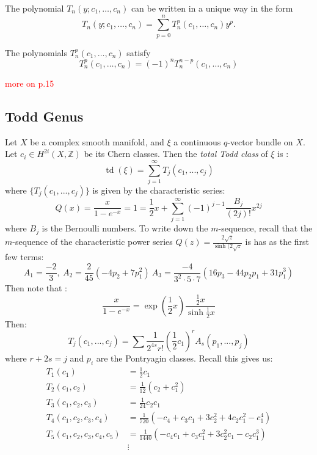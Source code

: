 \documentclass{book}
\newcommand{\Z}{{\mathbb{Z}}}
\newcommand{\td}{{\operatorname{td}}}
\begin{document}
The polynomial $T_n(y;c_1,\ldots,c_n)$ can be written in a unique way in the form
\[
    T_n(y;c_1,\ldots,c_n) = \sum_{p=0}^n T_n^p(c_1,\ldots,c_n)y^p.
\]

The polynomials $T_n^p(c_1,\ldots,c_n)$ satisfy
\[
    T_n^p(c_1,\ldots,c_n) = (-1)^n T_n^{n-p}(c_1,\ldots,c_n)
\]

\textcolor{red}{more on p.15}

\subsection{Todd Genus}\label{sec:toddGenus}

Let $X$ be a complex smooth manifold, and $\xi$ a continuous $q$-vector bundle on $X$. Let $c_i \in H^{2i}(X, \Z)$
be its Chern classes. Then the \emph{total Todd class} of $\xi$ is :
\[
  \td(\xi) = \sum_{j=1}^\infty T_j(c_1, ..., c_j)
\]
where $\{T_j(c_1, ..., c_j)\}$ is given by the characteristic series:
\[
  Q(x) = \frac{x}{1-e^{-x}} = 1 = \frac{1}{2}x + \sum_{j=1}^\infty (-1)^{j-1} \frac{B_j}{(2j)!}x^{2j}
\]
where $B_j$ is the Bernoulli numbers. To write down the $m$-sequence, recall that the $m$-sequence of the
characteristic power series $Q(z) = \frac{2\sqrt{z}}{\sinh(2\sqrt{z}}$ is has as the first few terms:
\[
  A_1 = \frac{-2}{3},\ A_2 = \frac{2}{45} (-4p_2 + 7p_1^2)\ A_3 = \frac{-4}{3^2\cdot 5\cdot 7} \left(16p_3
  - 44p_2p_1 + 31 p_1^3\right)
\]
Then note that :
\[
  \frac{x}{1-e^{-x}} = \exp \left(\frac{1}{2}x\right) \frac{\frac{1}{2}x}{\sinh \frac{1}{2}x}
\]
Then:
\[
  T_j(c_1, ..., c_j) = \sum \frac{1}{2^{4s}r!} \left(\frac{1}{2}c_1\right)^r A_s(p_1, ..., p_j)
\]
where $r+2s =j$ and $p_i$ are the Pontryagin classes. Recall this gives us:
\begin{align*}
  T_1(c_1) &= \frac{1}{2}c_1\\
  T_2(c_1, c_2) &= \frac{1}{12} (c_2 + c_1^2)\\
  T_3(c_1, c_2, c_3) &= \frac{1}{24} c_2c_1\\
  T_4(c_1, c_2, c_3, c_4) &= \frac{1}{720} (-c_4 + c_3c_1 + 3c_2^2 + 4c_2c_1^2 - c_1^4)\\
  T_5(c_1, c_2, c_3, c_4, c_5) &= \frac{1}{1440} \left(-c_4c_1 + c_3c_1^2  +3c_2^2c_1 - c_2c_1^3\right) \\
      &\vdots
\end{align*}
\end{document}
